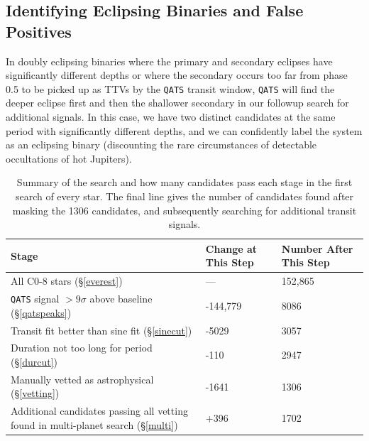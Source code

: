 \documentclass[twocolumn]{aastex62}
\newcommand{\pipeline}[1]{\texttt{#1}}
\newcommand{\npassz}{8086}
\newcommand{\nfailz}{144,779}
\newcommand{\npasssin}{3057}
\newcommand{\nelimsin}{5029}
\newcommand{\nelimdur}{110}
\newcommand{\npassdur}{2947}
\newcommand{\numstars}{152,865}
\newcommand{\nsystems}{1306}
\newcommand{\nastro}{1702}
\newcommand{\nmulti}{396}
\newcommand{\nfailvet}{1641}
\begin{document}
\subsection{Identifying Eclipsing Binaries and False Positives}
\label{ebsort}

In doubly eclipsing binaries where the primary and secondary eclipses
have significantly different depths or where the secondary occurs too
far from phase 0.5 to be picked up as TTVs by the \pipeline{QATS}
transit window, \pipeline{QATS} will find the deeper eclipse first and
then the shallower secondary in our followup search for additional
signals. In this case, we have two distinct candidates at the same
period with significantly different depths, and we can confidently
label the system as an eclipsing binary (discounting the rare
circumstances of detectable occultations of hot Jupiters).

\renewcommand{\arraystretch}{1.2}
\begin{table}[tbp]
\caption{Summary of the search and how many candidates pass each stage
  in the first search of every star.  The final line gives the number
  of candidates found after masking the \nsystems{} candidates, and
  subsequently searching for additional transit signals.
\label{tab:cuts}}
\centering 
\begin{tabular}{
  |p{}
  |p{}
  |p{}|
  }
\hline
Stage  & Change at This Step & Number After This Step  \\
\hline
All C0-8 stars (\S\ref{everest}) & --- & \numstars{} \\
\hline
\pipeline{QATS} signal $> 9\sigma$ above baseline (\S\ref{qatspeaks}) & -\nfailz{} & \npassz{} \\
\hline
Transit fit better than sine fit  (\S\ref{sinecut}) & -\nelimsin{} &  \npasssin{} \\
\hline
Duration not too long for period (\S\ref{durcut})  &  -\nelimdur{} & \npassdur{} \\
\hline
Manually vetted as astrophysical (\S\ref{vetting})& -\nfailvet{}  & \nsystems{}  \\
\hline\hline
Additional candidates passing all vetting found in multi-planet search (\S\ref{multi}) & +\nmulti{} & \nastro{} \\
\hline
\end{tabular}
\end{table}
\renewcommand{\arraystretch}{1.}
\end{document}

